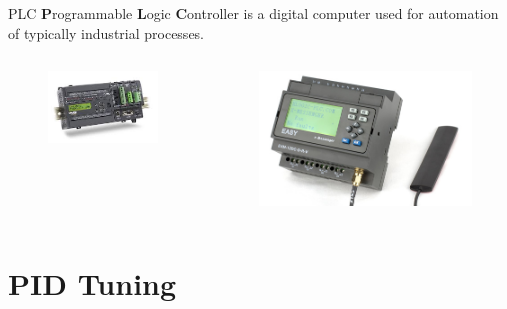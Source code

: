 \begin{frame}{PLC}
	\textbf{P}rogrammable \textbf{L}ogic \textbf{C}ontroller is a digital computer used for automation of typically industrial processes. 
	\begin{columns}
		\begin{column}{0.5\textwidth}
			\begin{figure}
\centering
\includegraphics[width=0.7\linewidth]{img/PLC_1}
\end{figure}

		\end{column}
		\begin{column}{0.5\textwidth}
\begin{figure}
\centering
\includegraphics[width=0.7\linewidth]{img/PLC_2}

\end{figure}

		\end{column}
	\end{columns}
\end{frame}
\section{PID Tuning}

